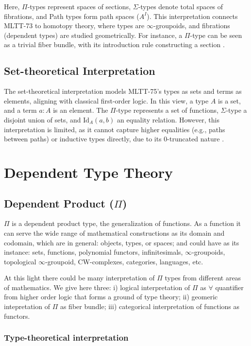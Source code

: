 \documentclass{article}
\theoremstyle{definition}
\begin{document}
Here, $\Pi$-types represent spaces of sections, $\Sigma$-types denote
total spaces of fibrations, and Path types form path spaces ($A^I$).
This interpretation connects MLTT-73 to homotopy theory, where types
are $\infty$-groupoids, and fibrations (dependent types) are studied
geometrically. For instance, a $\Pi$-type can be seen as a trivial fiber
bundle, with its introduction rule constructing a section \cite{HoTT13}.

\subsection*{Set-theoretical Interpretation}

The set-theoretical interpretation models MLTT-75’s types as sets and
terms as elements, aligning with classical first-order logic. In this
view, a type $A$ is a set, and a term $a : A$ is an element. The $\Pi$-type
represents a set of functions, $\Sigma$-type a disjoint union of sets,
and $\text{Id}_A(a, b)$ an equality relation. However, this interpretation
is limited, as it cannot capture higher equalities (e.g., paths between paths)
or inductive types directly, due to its 0-truncated nature \cite{HoTT13}.

\section{Dependent Type Theory}

\subsection{Dependent Product ($\Pi$)}

$\Pi$ is a dependent product type, the generalization of functions.
As a function it can serve the wide range of mathematical constructions as its domain and codomain,
which are in general: objects, types, or spaces; and could have as its
instance: sets, functions, polynomial functors, infinitesimals, $\infty$-groupoids,
topological $\infty$-groupoid, CW-complexes,
categories, languages, etc.

At this light there could be many interpretation of $\Pi$ types from different
areas of mathematics. We give here three:
i) logical interpretation of $\Pi$ as $\forall$ quantifier from higher order logic that forms a ground of type theory;
ii) geomeric intepretation of $\Pi$ as fiber bundle;
iii) categorical interpretation of functions as functors.

\subsubsection*{Type-theoretical interpretation}
\end{document}
